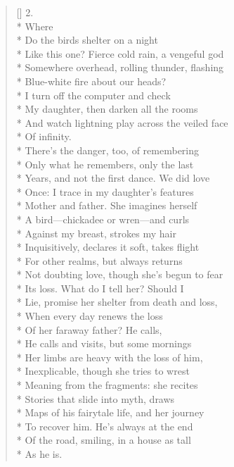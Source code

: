 \begin{verse}[\versewidth]
2. \\*
 \qquad  \qquad  \qquad  \qquad  \qquad Where\\*
Do the birds shelter on a night\\*
Like this one? Fierce cold rain, a vengeful god\\*
Somewhere overhead, rolling thunder, flashing\\*
Blue-white fire about our heads?\\*
I turn off the computer and check\\*
My daughter, then darken all the rooms\\*
And watch lightning play across the veiled face\\*
Of infinity.\\*
 \qquad  \qquad There's the danger, too, of remembering\\*
Only what he remembers, only the last \\*
Years, and not the first dance. We did love\\*
Once: I trace in my daughter's features\\*
Mother and father.  She imagines herself\\*
A bird---chickadee or wren---and curls\\*
Against my breast, strokes my hair\\*
Inquisitively, declares it soft, takes flight\\*
For other realms, but always returns\\*
Not doubting love, though she's begun to fear\\*
Its loss.  What do I tell her?  Should I\\*
Lie, promise her shelter from death and loss,\\*
When every day renews the loss\\*
Of her faraway father?  He calls,\\*
He calls and visits, but some mornings\\*
Her limbs are heavy with the loss of him,\\*
Inexplicable, though she tries to wrest\\*
Meaning from the fragments: she recites\\*
Stories that slide into myth, draws\\*
Maps of his fairytale life, and her journey\\*
To recover him.  He's always at the end\\*
Of the road, smiling, in a house as tall\\*
As he is.


\end{verse}
